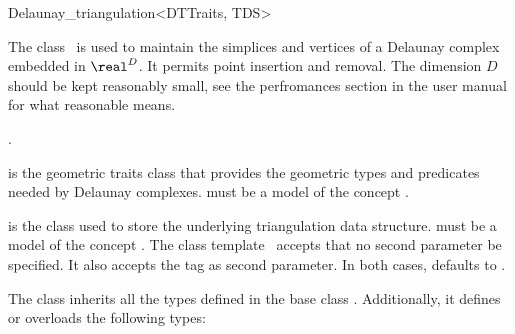 \begin{ccRefClass}{Delaunay_triangulation<DTTraits, TDS>}

\ccDefinition

The class \ccRefName\ is used to maintain the simplices and vertices of a
Delaunay complex embedded in $\real^D$. It permits point insertion and
removal. The dimension $D$ should be kept reasonably small,
see the perfromances section in the user manual for what reasonable
means.


\ccInheritsFrom
{}.

\ccParameters

 is the geometric traits class that provides the geometric types
and predicates needed by Delaunay complexes.  must be a model of
the concept .

 is the class used to store the underlying triangulation data
structure.  must be a model of the concept
. The class template \ccRefName\ accepts that no
second parameter be specified. It also accepts the tag  as
second parameter. In both cases,  defaults to
.


\ccTypes %

The class  inherits all the types
defined in the base class . Additionally, it
defines or overloads the following types:



\ccCreation %





\end{ccRefClass}
